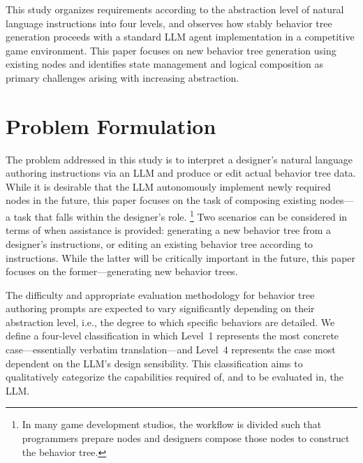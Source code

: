 \documentclass[conference]{IEEEtran}
\begin{document}
This study organizes requirements according to the abstraction level of natural language instructions into four levels, and observes how stably behavior tree generation proceeds with a standard LLM agent implementation in a competitive game environment. This paper focuses on new behavior tree generation using existing nodes and identifies state management and logical composition as primary challenges arising with increasing abstraction.

\section{Problem Formulation}

The problem addressed in this study is to interpret a designer's natural language authoring instructions via an LLM and produce or edit actual behavior tree data. While it is desirable that the LLM autonomously implement newly required nodes in the future, this paper focuses on the task of composing existing nodes---a task that falls within the designer's role.%
\footnote{In many game development studios, the workflow is divided such that programmers prepare nodes and designers compose those nodes to construct the behavior tree.}
Two scenarios can be considered in terms of when assistance is provided: generating a new behavior tree from a designer's instructions, or editing an existing behavior tree according to instructions. While the latter will be critically important in the future, this paper focuses on the former---generating new behavior trees.

The difficulty and appropriate evaluation methodology for behavior tree authoring prompts are expected to vary significantly depending on their abstraction level, i.e., the degree to which specific behaviors are detailed. We define a four-level classification in which Level~1 represents the most concrete case---essentially verbatim translation---and Level~4 represents the case most dependent on the LLM's design sensibility. This classification aims to qualitatively categorize the capabilities required of, and to be evaluated in, the LLM.
\end{document}
